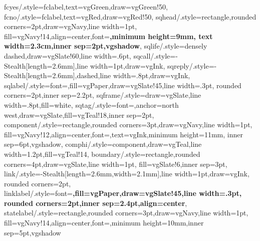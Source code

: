 {  fcyes/.style={fclabel,text=vgGreen,draw=vgGreen!50},
  fcno/.style={fclabel,text=vgRed,draw=vgRed!50},
  sqhead/.style={rectangle,rounded corners=2pt,draw=vgNavy,line width=1pt,
    fill=vgNavy!14,align=center,font=\normalsize\bfseries,minimum height=9mm,
    text width=2.3cm,inner sep=2pt,vgshadow},
  sqlife/.style={densely dashed,draw=vgSlate!60,line width=.6pt},
  sqcall/.style={-{Stealth[length=2.6mm]},line width=1pt,draw=vgInk},
  sqreply/.style={-{Stealth[length=2.6mm]},dashed,line width=.8pt,draw=vgInk},
  sqlabel/.style={font=\small,fill=vgPaper,draw=vgSlate!45,line width=.3pt,
    rounded corners=2pt,inner sep=2.2pt},
  sqframe/.style={draw=vgSlate,line width=.8pt,fill=white},
  sqtag/.style={font=\small,anchor=north west,draw=vgSlate,fill=vgTeal!18,inner sep=2pt},
  component/.style={rectangle,rounded corners=3pt,draw=vgNavy,line width=1pt,
    fill=vgNavy!12,align=center,font=\normalsize,text=vgInk,minimum height=11mm,
    inner sep=6pt,vgshadow},
  comphi/.style={component,draw=vgTeal,line width=1.2pt,fill=vgTeal!14},
  boundary/.style={rectangle,rounded corners=4pt,draw=vgSlate,line width=1pt,
    fill=vgSlate!6,inner sep=3pt},
  link/.style={-{Stealth[length=2.6mm,width=2.1mm]},line width=1pt,draw=vgInk,
    rounded corners=2pt},
  linklabel/.style={font=\small\bfseries,fill=vgPaper,draw=vgSlate!45,line width=.3pt,
    rounded corners=2pt,inner sep=2.4pt,align=center},
  statelabel/.style={rectangle,rounded corners=3pt,draw=vgNavy,line width=1pt,
    fill=vgNavy!14,align=center,font=\normalsize,minimum height=10mm,inner sep=5pt,vgshadow}
}
